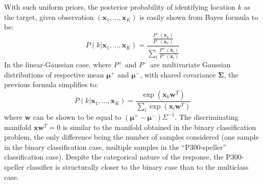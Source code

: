 \documentclass[conference]{IEEEtran}
\begin{document}

With such uniform priors, the posterior probability of identifying location $k$ as the target, 
given observation $(\boldsymbol{x}_1,...,\boldsymbol{x}_K)$ is 
easily shown from Bayes formula to be:
\begin{equation}
P(k|\boldsymbol{x}_1,...,\boldsymbol{x}_K) = \frac{\frac{P^+(\boldsymbol{x}_k)}{P^-(\boldsymbol{x}_k)}}
                                          {\sum_l \frac{P^+(\boldsymbol{x}_l)}{P^-(\boldsymbol{x}_l)}} 
\end{equation}
In the linear-Gaussian case, where $P^+$ and $P^-$ are multivariate Gaussian distributions of respective mean
$\boldsymbol{\mu}^+$ and $\boldsymbol{\mu}^-$, with shared covariance $\boldsymbol{\Sigma}$, 
the previous formula simplifies to:
\begin{equation}\label{eq:model-free}
 P(k|\boldsymbol{x}_1,...,\boldsymbol{x}_K) = \frac{\exp(\boldsymbol{x}_k \boldsymbol{w}^T)}
                                             {\sum_l  \exp(\boldsymbol{x}_l \boldsymbol{w}^T)}
\end{equation}
where $\boldsymbol{w}$ can be shown to be equal to $(\boldsymbol{\mu}^+ - \boldsymbol{\mu}^-)\Sigma^{-1}$.
The discriminating manifold $\boldsymbol{x}\boldsymbol{w}^T=0$ is similar to the 
manifold obtained in the binary classification problem, the only difference being the number of samples considered (one sample in the binary
classification case, multiple samples in the ``P300-speller'' classification case). 
Despite the categorical nature of the response, the P300-speller classifier is structurally closer to the binary case 
than to the multiclass case. 
\end{document}

